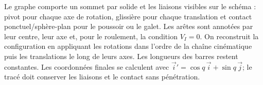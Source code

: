 \begin{corrigebox}
Le graphe comporte un sommet par solide et les
                    liaisons visibles sur le schéma : pivot pour chaque axe de rotation,
                    glissière pour chaque translation et contact ponctuel/sphère-plan pour
                    le poussoir ou le galet. Les arêtes sont annotées par leur centre,
                    leur axe et, pour le roulement, la condition $V_I=0$.
On reconstruit la configuration en appliquant les
                rotations dans l'ordre de la chaîne cinématique puis les translations le
                long de leurs axes. Les longueurs des barres restent constantes. Les
                coordonnées finales se calculent avec
                $\vec i'=\cos q\,\vec i+\sin q\,\vec j$; le tracé doit conserver les
                liaisons et le contact sans pénétration.
\end{corrigebox}
